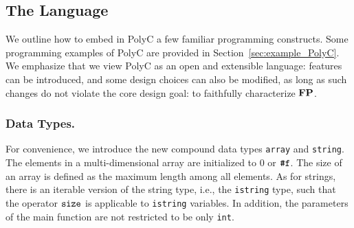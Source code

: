 \documentclass[runningheads]{llncs}
\begin{document}
\subsection{The Language}
\label{subsec:language}
We outline how to embed in PolyC a few familiar programming constructs.
Some programming examples of PolyC are provided in Section~\ref{sec:example_PolyC}.
We emphasize that we view PolyC as an open and extensible language: features can be introduced, and some design choices can also be modified, as long as such changes do not violate the core design goal: to faithfully characterize $\mathbf{FP}$.

\subsubsection{Data Types.}
For convenience, we introduce the new compound data types \texttt{array} and \texttt{string}.
The elements in a multi-dimensional array are initialized to $0$ or $\texttt{\#}\mathtt{f}$.
The size of an array is defined as the maximum length among all elements.
As for strings, there is an iterable version of the string type, i.e., the \texttt{istring} type, such that the operator $\mathtt{size}$ is applicable to \texttt{istring} variables.
In addition, the parameters of the main function are not restricted to be only \texttt{int}.
\end{document}
